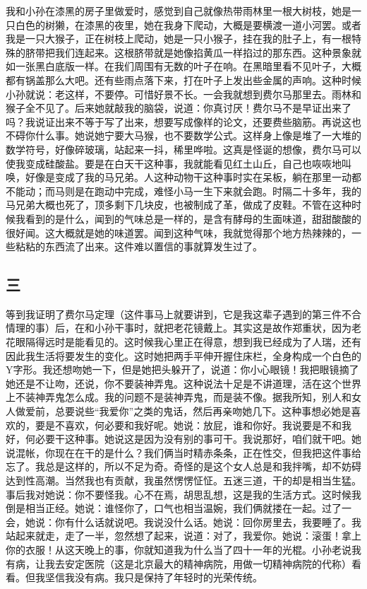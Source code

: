 我和小孙在漆黑的房子里做爱时，感觉到自己就像热带雨林里一根大树枝，她是一只白色的树獭，在漆黑的夜里，她在我身下爬动，大概是要横渡一道小河罢。或者我是一只大猴子，正在树枝上爬动，她是一只小猴子，挂在我的肚子上，有一根特殊的脐带把我们连起来。这根脐带就是她像掐黄瓜一样掐过的那东西。这种景象就如一张黑白底版一样。在我们周围有无数的叶子在响。在黑暗里看不见叶子，大概都有锅盖那么大吧。还有些雨点落下来，打在叶子上发出些金属的声响。这种时候小孙就说：老这样，不要停。可惜好景不长。一会我就想到费尔马那里去。雨林和猴子全不见了。后来她就敲我的脑袋，说道：你真讨厌！费尔马不是早证出来了吗？我说证出来不等于写了出来，想要写成像样的论文，还要费些脑筋。再说这也不碍你什么事。她说她宁要大马猴，也不要数学公式。这样身上像是堆了一大堆的数学符号，好像碎玻璃，站起来一抖，稀里哗啦。这真是怪诞的想像，费尔马可以使我变成硅酸盐。要是在白天干这种事，我就能看见红土山丘，自己也咴咴地叫唤，好像是变成了我的马兄弟。人这种动物干这种事时实在呆板，躺在那里一动都不能动；而马则是在跑动中完成，难怪小马一生下来就会跑。时隔二十多年，我的马兄弟大概也死了，顶多剩下几块皮，也被制成了革，做成了皮鞋。不管在这种时候我看到的是什么，闻到的气味总是一样的，是含有酵母的生面味道，甜甜酸酸的很好闻。这大概就是她的味道罢。闻到这种气味，我就觉得那个地方热辣辣的，一些粘粘的东西流了出来。这件难以置信的事就算发生过了。 

\subsection{三} 

等到我证明了费尔马定理（这件事马上就要讲到，它是我这辈子遇到的第三件不合情理的事）后，在和小孙干事时，就把老花镜戴上。其实这是故作郑重状，因为老花眼隔得远时是能看见的。这时候我心里正在得意，想到我已经成为了人瑞，还有因此我生活将要发生的变化。这时她把两手平伸开握住床栏，全身构成一个白色的Y字形。我还想吻她一下，但是她把头躲开了，说道：你小心眼镜！我把眼镜摘了她还是不让吻，还说，你不要装神弄鬼。这种说法十足是不讲道理，活在这个世界上不装神弄鬼怎么成。我的问题不是装神弄鬼，而是装不像。据我所知，别人和女人做爱前，总要说些“我爱你”之类的鬼话，然后再亲吻她几下。这种事想必她是喜欢的，要是不喜欢，何必要和我好呢。她说：放屁，谁和你好。我说要是不和我好，何必要干这种事。她说这是因为没有别的事可干。我说那好，咱们就干吧。她说混帐，你现在在干的是什么？我们俩当时精赤条条，正在性交，但我把这件事给忘了。我总是这样的，所以不足为奇。奇怪的是这个女人总是和我拌嘴，却不妨碍达到性高潮。当然我也有贡献，我虽然愣愣怔怔。五迷三道，干的却是相当生猛。事后我对她说：你不要怪我。心不在焉，胡思乱想，这是我的生活方式。这时候我倒是相当正经。她说：谁怪你了，口气也相当温婉，我们俩就搂在一起。过了一会，她说：你有什么话就说吧。我说没什么话。她说：回你房里去，我要睡了。我站起来就走，走了一半，忽然想了起来，说道：对了，我爱你。她说：滚蛋！拿上你的衣服！从这天晚上的事，你就知道我为什么当了四十一年的光棍。小孙老说我有病，让我去安定医院（这是北京最大的精神病院，用做一切精神病院的代称）看看。但我坚信我没有病。我只是保持了年轻时的光荣传统。 

